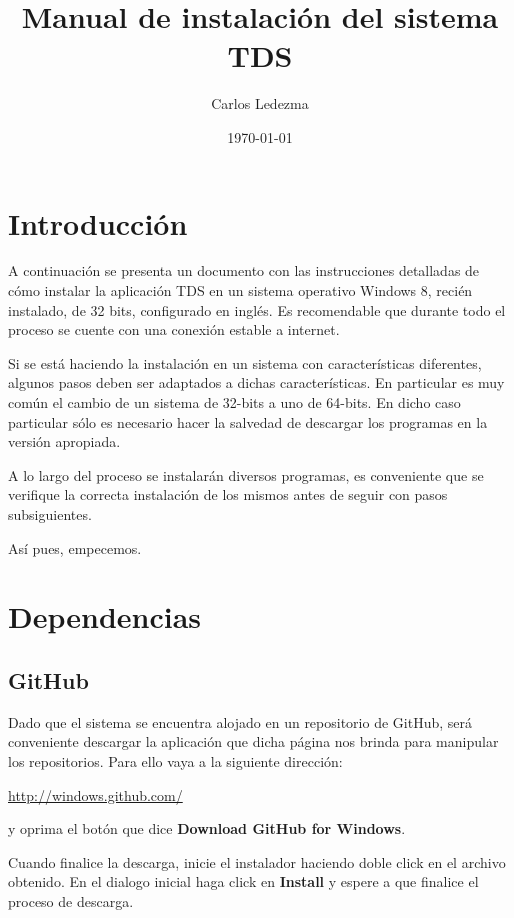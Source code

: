 \documentclass[9pt, letterpaper, oneside]{report}
\title{Manual de instalación del sistema TDS}
\author{Carlos Ledezma}
\date{\today}
\begin{document}
\maketitle

\newpage

\tableofcontents

\newpage

\chapter{Introducción}

  A continuación se presenta un documento con las instrucciones detalladas de cómo
  instalar la aplicación TDS en un sistema operativo Windows 8, recién instalado,
  de 32 bits, configurado en inglés. Es recomendable que durante todo el proceso
  se cuente con una conexión estable a internet.

  Si se está haciendo la instalación en un sistema con características diferentes,
  algunos pasos deben ser adaptados a dichas características. En particular es muy
  común el cambio de un sistema de 32-bits a uno de 64-bits. En dicho caso
  particular sólo es necesario hacer la salvedad de descargar los programas en la
  versión apropiada.

  A lo largo del proceso se instalarán diversos programas, es conveniente que se
  verifique la correcta instalación de los mismos antes de seguir con pasos 
  subsiguientes.

  Así pues, empecemos.

\chapter{Dependencias}

  \section{GitHub}
    Dado que el sistema se encuentra alojado en un repositorio de GitHub, será
    conveniente descargar la aplicación que dicha página nos brinda para manipular
    los repositorios. Para ello vaya a la siguiente dirección:

    \vspace{3mm}
    \url{http://windows.github.com/}
    \vspace{3mm}

    y oprima el botón que dice \textbf{Download GitHub for Windows}.

    Cuando finalice la descarga, inicie el instalador haciendo doble click en el
    archivo obtenido. En el dialogo inicial haga click en \textbf{Install} y espere a que
    finalice el proceso de descarga.
\end{document}
